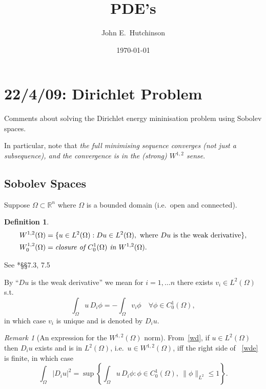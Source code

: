\documentclass[a4paper]{amsart}
\theoremstyle{plain}
\theoremstyle{definition}
\newtheorem{definition}[theorem]{Definition}%
\theoremstyle{remark}
\newtheorem{remark}[theorem]{Remark}
\begin{document}
\title{PDE's}  
\author{John E.\ Hutchinson}
\date{\today}


\maketitle

\tableofcontents


\section{\textbf{22/4/09: Dirichlet Problem}} 
Comments  about solving the Dirichlet energy mininisation problem using Sobolev spaces.  

In particular,   note that \emph{the full minimising sequence  converges (not just a subsequence), and the convergence is in the (strong) $ W^{1,2} $ sense}.

\subsection{Sobolev Spaces}
Suppose $ \Omega \subset \mathbb{R}^n $ where $ \Omega $ is a bounded domain (i.e.\ open and connected).


\begin{definition}
\begin{align*} 
W^{1,2}(\Omega) &= \{ u \in L^2(\Omega) : Du \in L^2(\Omega), \text{ where $ Du $   is the weak derivative}\},\\
W_0^{1,2}(\Omega) &= \emph{closure of $ C_0^1(\Omega) $ in $ W^{1,2}(\Omega)$} .
\end{align*} 
\end{definition} 
See \cite{GT}*{\S\S 7.3, 7.5}

\medskip
By ``$  Du $ is the weak derivative'' we mean for $ i=1,\dots n $ there exists $ v_i \in L^2(\Omega) $ s.t.\
\begin{equation} \label{wd}
\int_\Omega u\, D_i\phi = - \int_\Omega v_i \phi \quad  \forall \phi \in C_0^1(\Omega),
\end{equation}
in which case $ v_i $ is unique and is denoted by $D_i u$.  

 \begin{remark}[An expression for the $ W^{1,2}(\Omega) $ norm]
From~\eqref{wd}, if $ u \in L^2(\Omega) $ then $ D_i u $ exists and is in $ L^2(\Omega) $, i.e.\  $ u \in W^{1,2} (\Omega)$,  iff the right side of ~\eqref{wde}  is finite, in which case
\begin{equation} \label{wde}
\int_\Omega |D_iu|^2 = \sup \left\{ \int_\Omega u\, D_i\phi : \phi \in C_0^1(\Omega), \ \|\phi\|_{L^2} \leq 1 \right\}.
\end{equation}
\end{remark} 
\end{document}
